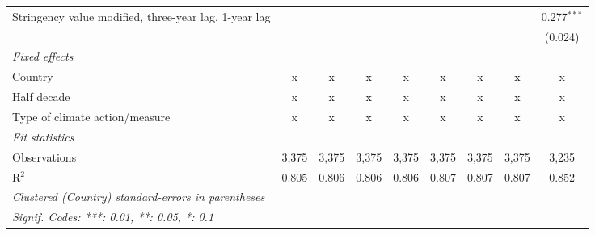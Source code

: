 \begin{table}[htbp]
\begin{tabular}{lcccccccc}
      Stringency value modified, three-year lag, 1-year lag                     &              &                &                &                &                &                &                & 0.277$^{***}$\\   
                                                                                &              &                &                &                &                &                &                & (0.024)\\   
      \emph{Fixed effects}\\
      Country                                                                   & x            & x              & x              & x              & x              & x              & x              & x\\  
      Half decade                                                               & x            & x              & x              & x              & x              & x              & x              & x\\  
      Type of climate action/measure                                            & x            & x              & x              & x              & x              & x              & x              & x\\  
      \midrule \emph{Fit statistics}\\
      Observations                                                              & 3,375        & 3,375          & 3,375          & 3,375          & 3,375          & 3,375          & 3,375          & 3,235\\  
      R$^2$                                                                     & 0.805        & 0.806          & 0.806          & 0.806          & 0.807          & 0.807          & 0.807          & 0.852\\  
      \midrule
      \multicolumn{9}{l}{\emph{Clustered (Country) standard-errors in parentheses}}\\
      \multicolumn{9}{l}{\emph{Signif. Codes: ***: 0.01, **: 0.05, *: 0.1}}\\
   \end{tabular}
\end{table}


